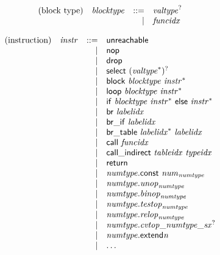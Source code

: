 \vspace{1ex}

$$
\begin{array}{@{}lrrl@{}l@{}}
\mbox{(block type)} & {\mathit{blocktype}} &::=& {{\mathit{valtype}}^?} \\ &&|&
{\mathit{funcidx}} \\
\end{array}
$$

$$
\begin{array}{@{}lrrl@{}l@{}}
\mbox{(instruction)} & {\mathit{instr}} &::=& \mathsf{unreachable} \\ &&|&
\mathsf{nop} \\ &&|&
\mathsf{drop} \\ &&|&
\mathsf{select}~{({{\mathit{valtype}}^\ast})^?} \\ &&|&
\mathsf{block}~{\mathit{blocktype}}~{{\mathit{instr}}^\ast} \\ &&|&
\mathsf{loop}~{\mathit{blocktype}}~{{\mathit{instr}}^\ast} \\ &&|&
\mathsf{if}~{\mathit{blocktype}}~{{\mathit{instr}}^\ast}~\mathsf{else}~{{\mathit{instr}}^\ast} \\ &&|&
\mathsf{br}~{\mathit{labelidx}} \\ &&|&
\mathsf{br\_if}~{\mathit{labelidx}} \\ &&|&
\mathsf{br\_table}~{{\mathit{labelidx}}^\ast}~{\mathit{labelidx}} \\ &&|&
\mathsf{call}~{\mathit{funcidx}} \\ &&|&
\mathsf{call\_indirect}~{\mathit{tableidx}}~{\mathit{typeidx}} \\ &&|&
\mathsf{return} \\ &&|&
{\mathit{numtype}}.\mathsf{const}~{{\mathit{num}}}_{{\mathit{numtype}}} \\ &&|&
{\mathit{numtype}} . {{\mathit{unop}}}_{{\mathit{numtype}}} \\ &&|&
{\mathit{numtype}} . {{\mathit{binop}}}_{{\mathit{numtype}}} \\ &&|&
{\mathit{numtype}} . {{\mathit{testop}}}_{{\mathit{numtype}}} \\ &&|&
{\mathit{numtype}} . {{\mathit{relop}}}_{{\mathit{numtype}}} \\ &&|&
{\mathit{numtype}} . {{{{{\mathit{cvtop}}}{\mathsf{\_}}}{{\mathit{numtype}}}}{\mathsf{\_}}}{{{\mathit{sx}}^?}} \\ &&|&
{{\mathit{numtype}}.\mathsf{extend}}{{\mathit{n}}} \\ &&|&
\dots \\

\end{array}$$
